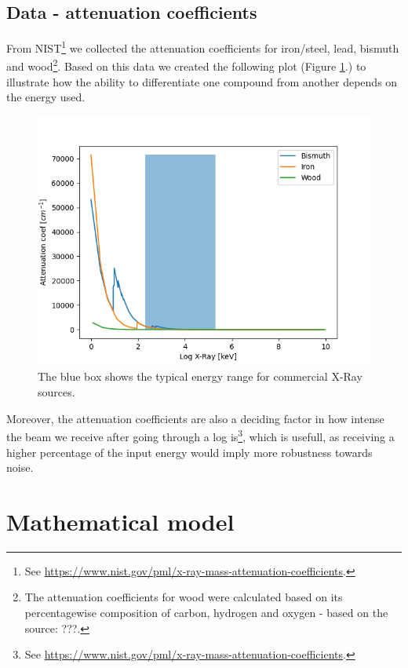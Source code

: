 \documentclass{article}
\begin{document}
\subsection{Data - attenuation coefficients} \label{NISTDATA}
From NIST\footnote{See \url{https://www.nist.gov/pml/x-ray-mass-attenuation-coefficients}.} we collected the attenuation coefficients for iron/steel, lead, bismuth and wood\footnote{The attenuation coefficients for wood were calculated based on its percentagewise composition of carbon, hydrogen and oxygen - based on the source: ???.}. Based on this data we created the following plot (Figure \ref{fig:all-NIST-attenuation-coef-data}.) to illustrate how the ability to differentiate one compound from another depends on the energy used.
\begin{figure}[H]
    \centering
    \includegraphics[scale=0.5]{images/all_NIST_attenuation_coef_data.png}
    \caption{The blue box shows the typical energy range for commercial X-Ray sources.}
    \label{fig:all-NIST-attenuation-coef-data}
\end{figure} 
\noindent Moreover, the attenuation coefficients are also a deciding factor in how intense the beam we receive after going through a log is\footnote{See \url{https://www.nist.gov/pml/x-ray-mass-attenuation-coefficients}.}, which is usefull, as receiving a higher percentage of the input energy would imply more robustness towards noise.

\section{Mathematical model}
\end{document}
